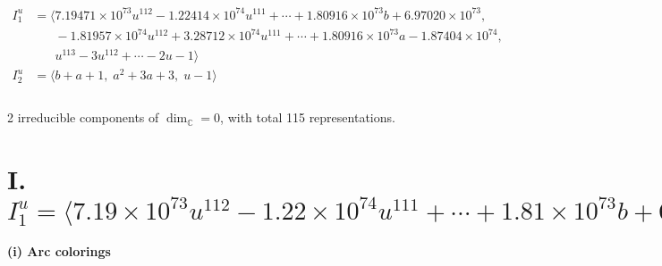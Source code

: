 \documentclass[1p]{elsarticle_modified}
\theoremstyle{definition}
\begin{document}
\begin{align*}
I^u_{1}&=\langle 
7.19471\times10^{73} u^{112}-1.22414\times10^{74} u^{111}+\cdots+1.80916\times10^{73} b+6.97020\times10^{73},\\
\phantom{I^u_{1}}&\phantom{= \langle  }-1.81957\times10^{74} u^{112}+3.28712\times10^{74} u^{111}+\cdots+1.80916\times10^{73} a-1.87404\times10^{74},\\
\phantom{I^u_{1}}&\phantom{= \langle  }u^{113}-3 u^{112}+\cdots-2 u-1\rangle \\
I^u_{2}&=\langle 
b+a+1,\;a^2+3 a+3,\;u-1\rangle \\
\\
\end{align*}
\raggedright * 2 irreducible components of $\dim_{\mathbb{C}}=0$, with total 115 representations.\\
\newpage
\renewcommand{\arraystretch}{1}
\centering \section*{I. $I^u_{1}= \langle 7.19\times10^{73} u^{112}-1.22\times10^{74} u^{111}+\cdots+1.81\times10^{73} b+6.97\times10^{73},\;-1.82\times10^{74} u^{112}+3.29\times10^{74} u^{111}+\cdots+1.81\times10^{73} a-1.87\times10^{74},\;u^{113}-3 u^{112}+\cdots-2 u-1 \rangle$}
\flushleft \textbf{(i) Arc colorings}\\
\end{document}
